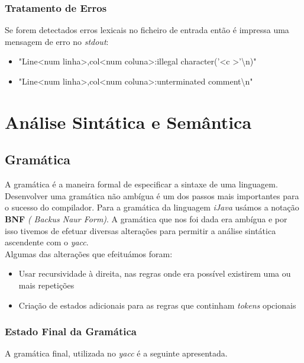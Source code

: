 \documentclass[12pt]{article}
\begin{document}
		\subsubsection{Tratamento de Erros}
		Se forem detectados erros lexicais no ficheiro de entrada então é impressa uma mensagem de erro no \emph{stdout}:
		\begin{itemize}
            \item "Line\textless num linha\textgreater,col\textless num coluna\textgreater:illegal character('\textless c \textgreater'\textbackslash n)"
            \item "Line\textless num linha\textgreater,col\textless num coluna\textgreater:unterminated comment\textbackslash n"
        \end{itemize}
		




\pagebreak

\section{Análise Sintática e Semântica}

\subsection{Gramática}

A gramática é a maneira formal de especificar a sintaxe de uma linguagem. 
Desenvolver uma gramática não ambígua é um dos passos mais importantes para o sucesso do compilador. Para a gramática da linguagem \emph{iJava} usámos a notação \textbf{BNF} \emph{( Backus Naur Form)}. 
A gramática que nos foi dada era ambígua e por isso tivemos de efetuar diversas alterações para permitir a análise sintática ascendente com o \emph{yacc}.\\
Algumas das alterações que efeituámos foram:
\begin{itemize}
	\item Usar recursividade à direita, nas regras onde era possível existirem uma ou mais repetições
	\item Criação de estados adicionais para as regras que continham \emph{tokens} opcionais
\end{itemize}



\subsubsection{Estado Final da Gramática}
A gramática final, utilizada no \emph{yacc} é a seguinte apresentada.
\end{document}
